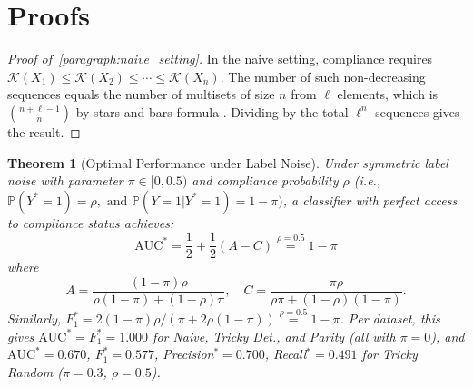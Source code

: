 \documentclass{article}
\theoremstyle{plain}
\newtheorem{theorem}{Theorem}[section]
\theoremstyle{definition}
\theoremstyle{remark}
\begin{document}
\begin{figure}[htbp]
    \label{fig:ngram_analysis}
\end{figure}


\newpage

\section{Proofs}
\label{appendix:proof_theorems}

\begin{proof}[Proof of~\ref{paragraph:naive_setting}]
\label{proof:naive_setting}
In the naive setting, compliance requires $\mathcal{K}(X_1) \leq \mathcal{K}(X_2) \leq \cdots \leq \mathcal{K}(X_n)$. The number of such non-decreasing sequences equals the number of multisets of size $n$ from $\ell$ elements, which is $\binom{n+\ell-1}{n}$ by stars and bars formula \citep{Stars_Bars}. Dividing by the total $\ell^n$ sequences gives the result.
\end{proof}

\begin{theorem}[Optimal Performance under Label Noise]
\label{thm:optimal_performance}
Under symmetric label noise with parameter $\pi \in [0, 0.5)$ and compliance probability $\rho$ (i.e., $\mathbb{P}(Y^{*}=1)=\rho, \text{ and } \mathbb{P}(Y=1|Y^{*}=1)=1-\pi)$, a classifier with perfect access to compliance status achieves:
\[
\mathrm{AUC}^* = \frac{1}{2} + \frac{1}{2}(A - C) \overset{\rho=0.5}{=} 1 - \pi
\]
where
\[
A = \frac{(1-\pi)\rho}{\rho(1-\pi) + (1-\rho)\pi}, \quad C = \frac{\pi\rho}{\rho\pi + (1-\rho)(1-\pi)}.
\]
Similarly, $F_1^* = 2(1-\pi)\rho / (\pi + 2\rho(1-\pi)) \overset{\rho=0.5}{=} 1-\pi$. Per dataset, this gives $\mathrm{AUC}^*=F_1^*=1.000$ for Naive, Tricky Det., and Parity (all with $\pi=0$), and $\mathrm{AUC}^*=0.670$, $F_1^*=0.577$, Precision$^*=0.700$, Recall$^*=0.491$ for Tricky Random ($\pi=0.3$, $\rho=0.5$).
\end{theorem}
\end{document}

